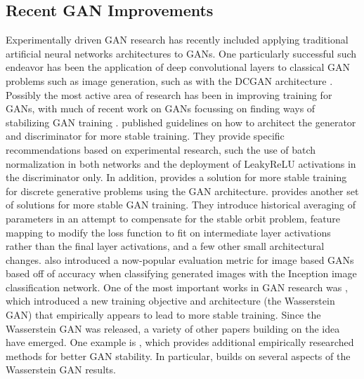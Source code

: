 \documentclass{article}
\begin{document}
\subsection{Recent GAN Improvements}
Experimentally driven GAN research has recently included applying traditional artificial neural networks architectures to GANs. One particularly successful such endeavor has been the application of deep convolutional layers to classical GAN problems such as image generation, such as with the DCGAN architecture \citep{DBLP:journals/corr/RadfordMC15}. Possibly the most active area of research has been in improving training for GANs, with much of recent work on GANs focussing on finding ways of stabilizing GAN training \citep{Salimans2016} \citep{DBLP:journals/corr/ArjovskyCB17} \citep{DBLP:conf/nips/NowozinCT16} \citep{DBLP:journals/corr/MetzPPS16}. \citet{DBLP:journals/corr/RadfordMC15} published guidelines on how to architect the generator and discriminator for more stable training. They provide specific recommendations based on experimental research, such the use of batch normalization in both networks and the deployment of LeakyReLU activations in the discriminator only. In addition, \citet{DBLP:journals/corr/HjelmJCCB17} provides a solution for more stable training for discrete generative problems using the GAN architecture. \citet{Salimans2016} provides another set of solutions for more stable GAN training. They introduce historical averaging of parameters in an attempt to compensate for the stable orbit problem, feature mapping to modify the loss function to fit on intermediate layer activations rather than the final layer activations, and a few other small architectural changes. \citet{Salimans2016} also introduced a now-popular evaluation metric for image based GANs based off of accuracy when classifying generated images with the Inception image classification network. One of the most important works in GAN research was \citet{DBLP:journals/corr/ArjovskyCB17}, which introduced a new training objective and architecture (the Wasserstein GAN) that empirically appears to lead to more stable training. Since the Wasserstein GAN was released, a variety of other papers building on the idea have emerged. One example is \citet{DBLP:journals/corr/GulrajaniAADC17}, which provides additional empirically researched methods for better GAN stability. In particular, \citep{Arora17} builds on several aspects of the Wasserstein GAN results. 
\end{document}
